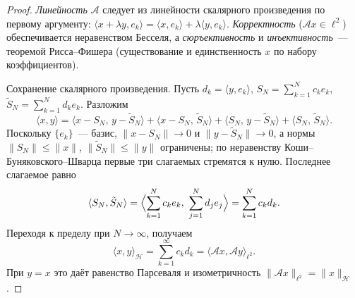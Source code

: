 \begin{proof}
	\emph{Линейность} $\mathcal{A}$ следует из линейности скалярного произведения по первому аргументу: $\langle x + \lambda y, e_k\rangle = \langle x, e_k\rangle + \lambda\langle y, e_k\rangle$. \emph{Корректность} ($\mathcal{A}x \in \ell^2$) обеспечивается неравенством Бесселя, а \emph{сюръективность} и \emph{инъективность}~--- теоремой Рисса--Фишера (существование и единственность $x$ по набору коэффициентов).

	Сохранение скалярного произведения. Пусть $d_k = \langle y, e_k\rangle$, $S_N = \sum_{k=1}^{N} c_k e_k$, $\tilde{S}_N = \sum_{k=1}^{N} d_k e_k$. Разложим
	\[
	\langle x, y\rangle = \langle x - S_N,\, y - \tilde{S}_N\rangle + \langle x - S_N,\, \tilde{S}_N\rangle + \langle S_N,\, y - \tilde{S}_N\rangle + \langle S_N,\, \tilde{S}_N\rangle.
	\]
	Поскольку $\{e_k\}$~--- базис, $\|x - S_N\| \to 0$ и $\|y - \tilde{S}_N\| \to 0$, а нормы $\|S_N\| \le \|x\|$, $\|\tilde{S}_N\| \le \|y\|$ ограничены; по неравенству Коши--Буняковского--Шварца первые три слагаемых стремятся к нулю. Последнее слагаемое равно
	\[
	\langle S_N, \tilde{S}_N\rangle = \Bigl\langle \sum_{k=1}^{N} c_k e_k,\ \sum_{j=1}^{N} d_j e_j \Bigr\rangle = \sum_{k=1}^{N} c_k d_k.
	\]
	Переходя к пределу при $N \to \infty$, получаем
	\[
	\langle x, y\rangle_{\mathcal{H}} = \sum_{k=1}^{\infty} c_k d_k = \langle \mathcal{A}x, \mathcal{A}y\rangle_{\ell^2}.
	\]
	При $y = x$ это даёт равенство Парсеваля и изометричность $\|\mathcal{A}x\|_{\ell^2} = \|x\|_{\mathcal{H}}$.
\end{proof}
